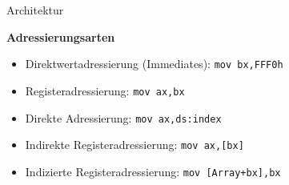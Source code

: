 \begin{frame}{Architektur}
	\begin{center}
	\textbf{Adressierungsarten}
	\end{center}

	\begin{itemize}
		\item Direktwertadressierung (Immediates): {\tt mov bx,FFF0h}
		\item Registeradressierung: {\tt mov 	ax,bx}
		\item Direkte Adressierung: {\tt mov 	ax,ds:index}
		\item Indirekte Registeradressierung: {\tt mov ax,[bx]}
		\item Indizierte Registeradressierung: {\tt mov [Array+bx],bx}
	\end{itemize}
\end{frame}
